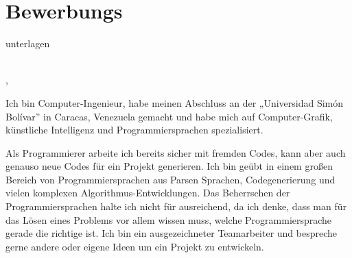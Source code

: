 \documentclass[11pt,a4paper,roman]{moderncv}
\begin{document}


\makeatletter
{}
\pagestyle{empty}

\chapter*{Bewerbungs}{unterlagen}

\vspace*{40mm}
\begin{minipage}{\textwidth}
	\vspace*{3mm}
	\familynamestyle{\@firstname}~~\firstnamestyle{\@familyname} 	
	\\[3mm]
	\@addressstreet, \@addresscity ~~~ \mobilesymbol~\@mobile ~~~ \emailsymbol~\@email
\end{minipage}
\begin{minipage}{70pt}

\vspace*{10mm}

\end{minipage}

Ich bin Computer-Ingenieur, habe meinen Abschluss an der „Universidad Simón Bolívar” in Caracas, Venezuela gemacht und habe mich auf Computer-Grafik, künstliche Intelligenz und Programmiersprachen spezialisiert.

\vspace*{2mm}

Als Programmierer arbeite ich bereits sicher mit fremden Codes, kann aber auch genauso neue Codes für ein Projekt generieren. Ich bin geübt in einem großen Bereich von Programmiersprachen aus Parsen Sprachen, Codegenerierung und vielen komplexen Algorithmus-Entwicklungen. Das Beherrschen der Programmiersprachen halte ich nicht für ausreichend, da ich denke, dass man für das Lösen eines Problems vor allem wissen muss, welche Programmiersprache gerade die richtige ist. Ich bin ein ausgezeichneter Teamarbeiter und bespreche gerne andere oder eigene Ideen um ein Projekt zu entwickeln. 
\end{document}
